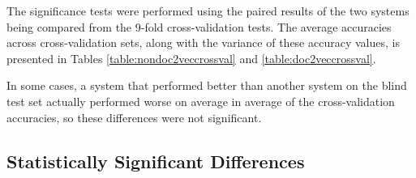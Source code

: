 \documentclass[twocolumn]{article}
\begin{document}
The significance tests were performed using the paired results of the two systems being compared from the 9-fold cross-validation tests. The average accuracies across cross-validation sets, along with the variance of these accuracy values, is presented in Tables \ref{table:nondoc2veccrossval} and \ref{table:doc2veccrossval}.

In some cases, a system that performed better than another system on the blind test set actually performed worse on average in average of the cross-validation accuracies, so these differences were not significant.

\subsection{Statistically Significant Differences}
\end{document}
